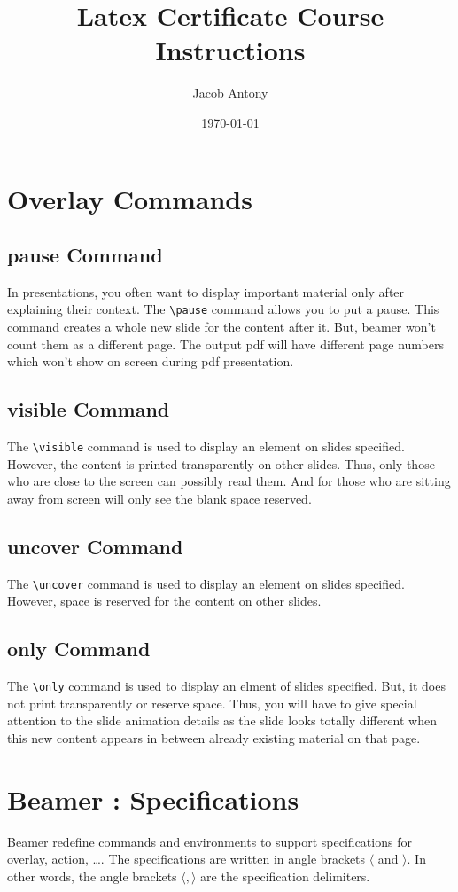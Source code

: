 \documentclass{article}
\title{Latex Certificate Course Instructions}
\author{Jacob Antony}
\date{\today}
\begin{document}
\maketitle

\section{Overlay Commands}

\subsection{pause Command}
	In presentations, you often want to display important material only after explaining their context. The \texttt{\textbackslash pause} command allows you to put a pause. This command creates a whole new slide for the content after it. But, beamer won't count them as a different page. The output pdf will have different page numbers which won't show on screen during pdf presentation.

\subsection{visible Command}
	The \texttt{\textbackslash visible} command is used to display an element on slides specified. However, the content is printed transparently on other slides. Thus, only those who are close to the screen can possibly read them. And for those who are sitting away from screen will only see the blank space reserved.

\subsection{uncover Command}
	The \texttt{\textbackslash uncover} command is used to display an element on slides specified. However, space is reserved for the content on other slides.

\subsection{only Command}
	The \texttt{\textbackslash only} command is used to display an elment of slides specified. But, it does not print transparently or reserve space. Thus, you will have to give special attention to the slide animation details as the slide looks totally different when this new content appears in between already existing material on that page.

\section{Beamer : Specifications}
	Beamer redefine commands and environments to support specifications for overlay, action, \dots. The specifications are written in angle brackets $\langle$ and $\rangle$. In other words, the angle brackets $\langle,\rangle$ are the specification delimiters.
\end{document}
